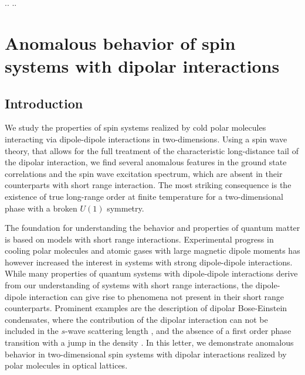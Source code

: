 \begin{tquote}{..}
    ..
\end{tquote}

\chapter{Anomalous behavior of spin systems with dipolar interactions}

\section{Introduction}
 We study the properties of spin systems realized by cold polar molecules interacting via dipole-dipole interactions in two-dimensions.
 Using a spin wave theory, that allows for the full treatment of the characteristic long-distance tail of the dipolar interaction, we find several
 anomalous features in the ground state correlations and the spin wave excitation spectrum, which are absent in their counterparts with short range interaction. The most striking consequence is
 the existence of true long-range order at finite temperature for a two-dimensional phase with a broken $U(1)$ symmetry.

The foundation for understanding the behavior and properties of quantum matter
is based on models with short range interactions. Experimental progress
in cooling polar molecules \cite{Ni2008b} and atomic gases with large magnetic dipole moments \cite{Griesmaier2005a}
has however increased the interest in systems with strong dipole-dipole interactions. While many
properties of quantum systems with dipole-dipole interactions derive from our understanding
of systems with short range interactions, the dipole-dipole interaction can give rise to phenomena
not present in their short range counterparts. Prominent examples are the description of dipolar
Bose-Einstein condensates, where the contribution of the dipolar interaction can not be included
in the $s$-wave scattering length \cite{Lahaye2009}, and the absence of a first order phase transition with a jump in the density \cite{Spivak2004}.
In this letter, we demonstrate anomalous behavior in two-dimensional spin systems with dipolar interactions
realized by polar molecules in optical lattices.

